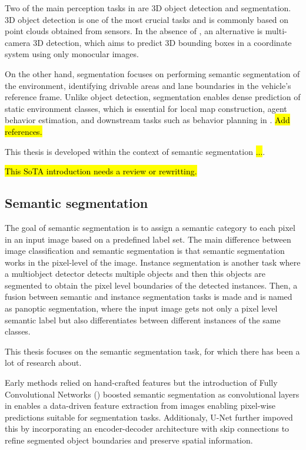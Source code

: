 Two of the main perception tasks in  are 3D object detection and  segmentation. 3D object detection is one of the most crucial tasks and is commonly based on point clouds obtained from  sensors. In the absence of , an alternative is multi-camera 3D detection, which aims to predict 3D bounding boxes in a  coordinate system using only monocular images.

On the other hand,  segmentation focuses on performing semantic segmentation of the environment, identifying drivable areas and lane boundaries in the vehicle's reference frame. Unlike object detection,  segmentation enables dense prediction of static environment classes, which is essential for local map construction, agent behavior estimation, and downstream tasks such as behavior planning in . \hl{Add references.}

This thesis is developed within the context of  semantic segmentation \hl{...}.

\hl{This SoTA introduction needs a review or rewritting.}

\subsection{Semantic segmentation} \label{sota_semantic_segmentation}
The goal of semantic segmentation is to assign a semantic category to each pixel in an input image based on a predefined label set. The main difference between image classification and semantic segmentation is that semantic segmentation works in the pixel-level of the image. Instance segmentation is another task where a multiobject detector detects multiple objects and then this objects are segmented to obtain the pixel level boundaries of the detected instances. Then, a fusion between semantic and instance segmentation tasks is made and is named as panoptic segmentation, where the input image gets not only a pixel level semantic label but also differentiates between different instances of the same classes. 

This thesis focuses on the semantic segmentation task, for which there has been a lot of research about.

Early methods relied on hand-crafted features but the introduction of Fully Convolutional Networks () \cite{FCNs} boosted semantic segmentation as convolutional layers in  enables a data-driven feature extraction from images enabling pixel-wise predictions suitable for segmentation tasks. Additionaly, U-Net \cite{u_net} further impoved this by incorporating an encoder-decoder architecture with skip connections to refine segmented object boundaries and preserve spatial information.

